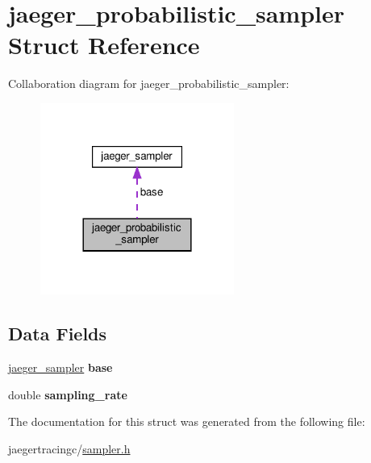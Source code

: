\hypertarget{structjaeger__probabilistic__sampler}{}\section{jaeger\+\_\+probabilistic\+\_\+sampler Struct Reference}
\label{structjaeger__probabilistic__sampler}


Collaboration diagram for jaeger\+\_\+probabilistic\+\_\+sampler\+:\nopagebreak
\begin{figure}[H]
\begin{center}
\leavevmode
\includegraphics[width=180pt]{structjaeger__probabilistic__sampler__coll__graph}
\end{center}
\end{figure}
\subsection*{Data Fields}
\begin{DoxyCompactItemize}
\item 
\mbox{\label{structjaeger__probabilistic__sampler_a3b25586eb505eb4991c7bc67e3d1ef40}} 
\mbox{\hyperlink{structjaeger__sampler}{jaeger\+\_\+sampler}} {\bfseries base}
\item 
\mbox{\label{structjaeger__probabilistic__sampler_aa74aad7ba4b1803ce8a4377be9a3f79d}} 
double {\bfseries sampling\+\_\+rate}
\end{DoxyCompactItemize}


The documentation for this struct was generated from the following file\+:\begin{DoxyCompactItemize}
\item 
jaegertracingc/\mbox{\hyperlink{sampler_8h}{sampler.\+h}}\end{DoxyCompactItemize}
